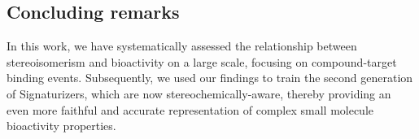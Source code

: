 \subsection{Concluding remarks}

In this work, we have systematically assessed the relationship between stereoisomerism and bioactivity on a large scale, focusing on compound-target binding events. Subsequently, we used our findings to train the second generation of Signaturizers, which are now stereochemically-aware, thereby providing an even more faithful and accurate representation of complex small molecule bioactivity properties.

